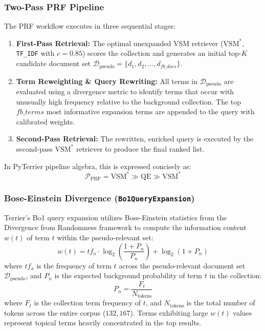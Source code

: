 \documentclass[10pt, a4paper]{article}
\begin{document}
\subsubsection{Two-Pass PRF Pipeline}
The PRF workflow executes in three sequential stages:
\begin{enumerate}[noitemsep,topsep=2pt]
    \item \textbf{First-Pass Retrieval:} The optimal unexpanded VSM retriever ($\text{VSM}^*$, \texttt{TF\_IDF} with $c=0.85$) scores the collection and generates an initial top-$K$ candidate document set $\mathcal{D}_{\text{pseudo}} = \{d_1, d_2, \dots, d_{fb\_docs}\}$.
    \item \textbf{Term Reweighting \& Query Rewriting:} All terms in $\mathcal{D}_{\text{pseudo}}$ are evaluated using a divergence metric to identify terms that occur with unusually high frequency relative to the background collection. The top $fb\_terms$ most informative expansion terms are appended to the query with calibrated weights.
    \item \textbf{Second-Pass Retrieval:} The rewritten, enriched query is executed by the second-pass $\text{VSM}^*$ retriever to produce the final ranked list.
\end{enumerate}

In PyTerrier pipeline algebra, this is expressed concisely as:
\begin{equation}
\mathcal{P}_{\text{PRF}} = \text{VSM}^* \gg \text{QE} \gg \text{VSM}^*
\end{equation}

\subsubsection{Bose-Einstein Divergence (\texttt{Bo1QueryExpansion})}
Terrier's Bo1 query expansion utilizes Bose-Einstein statistics from the Divergence from Randomness framework to compute the information content $w(t)$ of term $t$ within the pseudo-relevant set:
\begin{equation}
w(t) = tf_x \cdot \log_2\left(\frac{1 + P_n}{P_n}\right) + \log_2(1 + P_n)
\end{equation}
where $tf_x$ is the frequency of term $t$ across the pseudo-relevant document set $\mathcal{D}_{\text{pseudo}}$, and $P_n$ is the expected background probability of term $t$ in the collection:
\begin{equation}
P_n = \frac{F_t}{N_{\text{tokens}}}
\end{equation}
where $F_t$ is the collection term frequency of $t$, and $N_{\text{tokens}}$ is the total number of tokens across the entire corpus ($132,167$). Terms exhibiting large $w(t)$ values represent topical terms heavily concentrated in the top results.
\end{document}
